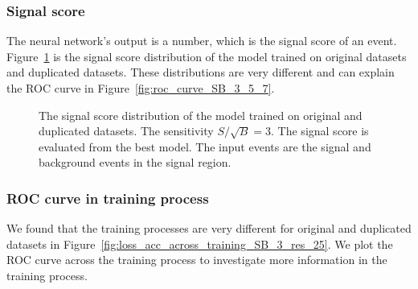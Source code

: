 \documentclass[12pt]{article}
\begin{document}
        \subsubsection{Signal score}%
        \label{subs:signal_score}
            The neural network's output is a number, which is the signal score of an event. Figure~\ref{fig:signal_score_SB_3} is the signal score distribution of the model trained on original datasets and duplicated datasets. These distributions are very different and can explain the ROC curve in Figure~\ref{fig:roc_curve_SB_3_5_7}.
            \begin{figure}[htpb]
                \centering
                \caption{The signal score distribution of the model trained on original and duplicated datasets. The sensitivity $S / \sqrt{B} = 3$. The signal score is evaluated from the best model. The input events are the signal and background events in the signal region.}
                \label{fig:signal_score_SB_3}
            \end{figure}
        \subsubsection{ROC curve in training process}%
        \label{subs:roc_curve_in_training_process}
            We found that the training processes are very different for original and duplicated datasets in Figure~\ref{fig:loss_acc_across_training_SB_3_res_25}. We plot the ROC curve across the training process to investigate more information in the training process.
\end{document}

